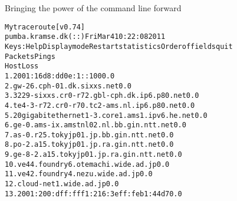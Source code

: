 \documentclass[28pt,landscape,a4paper,footrule]{foils}
\begin{document}

\centerline{Bringing the power of the command line forward}



\begin{alltt}\footnotesize
                                               My traceroute  [v0.74]
pumba.kramse.dk (::)                                           Fri Mar  4 10:22:08 2011
Keys:  Help   Display mode   Restart statistics   Order of fields   quit
                                                    Packets               Pings
 Host                                             Loss%   Snt   Last   Avg  Best  Wrst StDev
 1. 2001:16d8:dd0e:1::100                          0.0%     7    0.1   0.1   0.1   0.1   0.0
 2. gw-26.cph-01.dk.sixxs.net                      0.0%     6   13.7  13.7  13.6  13.9   0.1
 3. 3229-sixxs.cr0-r72.gbl-cph.dk.ip6.p80.net      0.0%     6   14.3  14.3  14.3  14.4   0.0
 4. te4-3-r72.cr0-r70.tc2-ams.nl.ip6.p80.net       0.0%     6   25.4  51.0  25.3 178.6  62.5
 5. 20gigabitethernet1-3.core1.ams1.ipv6.he.net    0.0%     6   25.8  26.5  25.7  29.9   1.7
 6. ge-0.ams-ix.amstnl02.nl.bb.gin.ntt.net         0.0%     6   26.3  32.0  26.3  60.2  13.8
 7. as-0.r25.tokyjp01.jp.bb.gin.ntt.net            0.0%     6  284.1 306.1 283.6 372.8  37.1
 8. po-2.a15.tokyjp01.jp.ra.gin.ntt.net            0.0%     6  298.4 298.3 298.1 298.5   0.2
 9. ge-8-2.a15.tokyjp01.jp.ra.gin.ntt.net          0.0%     6  301.2 301.2 300.9 301.7   0.3
10. ve44.foundry6.otemachi.wide.ad.jp              0.0%     6  300.9 300.9 300.8 301.0   0.1
11. ve42.foundry4.nezu.wide.ad.jp                  0.0%     6  301.0 301.0 300.9 301.3   0.2
12. cloud-net1.wide.ad.jp                          0.0%     6  301.1 301.0 300.9 301.1   0.1
13. 2001:200:dff:fff1:216:3eff:feb1:44d7           0.0%     6  301.3 301.2 301.0 301.3   0.1
\end{alltt}

\end{document}
